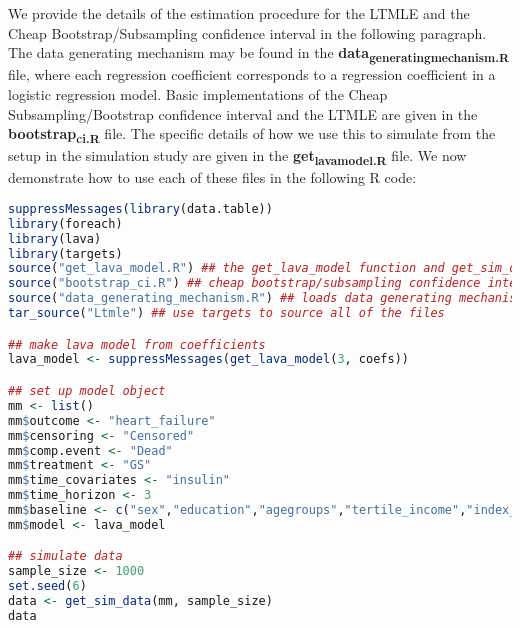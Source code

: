 \documentclass[11pt]{article}
\author{Johan Sebastian Ohlendorff}
\date{\today}
\title{}
\begin{document}
\tableofcontents

We provide the details of the estimation procedure for the LTMLE
and the Cheap Bootstrap/Subsampling confidence interval in the following paragraph.
The data generating mechanism may be found in the \textbf{data\textsubscript{generating}\textsubscript{mechanism.R}} file, where
each regression coefficient corresponds to a regression coefficient in a logistic regression model.
Basic implementations of the Cheap Subsampling/Bootstrap confidence interval and the LTMLE are
given in the \textbf{bootstrap\textsubscript{ci.R}} file. The specific details of how we use this to simulate
from the setup in the simulation study are given in the \textbf{get\textsubscript{lava}\textsubscript{model.R}} file. We now demonstrate how to use
each of these files in the following R code:

\begin{lstlisting}[language=r,numbers=none]
suppressMessages(library(data.table))
library(foreach)
library(lava)
library(targets)
source("get_lava_model.R") ## the get_lava_model function and get_sim_data function
source("bootstrap_ci.R") ## cheap bootstrap/subsampling confidence intervals
source("data_generating_mechanism.R") ## loads data generating mechanism into coefs
tar_source("Ltmle") ## use targets to source all of the files

## make lava model from coefficients
lava_model <- suppressMessages(get_lava_model(3, coefs))

## set up model object
mm <- list()
mm$outcome <- "heart_failure"
mm$censoring <- "Censored"
mm$comp.event <- "Dead"
mm$treatment <- "GS"
mm$time_covariates <- "insulin"
mm$time_horizon <- 3
mm$baseline <- c("sex","education","agegroups","tertile_income","index_heart_failure","diabetes_duration", "secondline_duration","first_2ndline")
mm$model <- lava_model

## simulate data
sample_size <- 1000
set.seed(6)
data <- get_sim_data(mm, sample_size)
data
\end{lstlisting}
\end{document}
